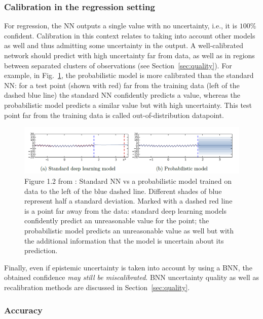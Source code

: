 \subsubsection{Calibration in the regression setting}\label{sec:calib}
For regression, the NN outputs a single value with no uncertainty, i.e., it is $100 \%$ confident. 
Calibration in this context relates to taking into account other models as well and thus admitting some uncertainty in the output.
A well-calibrated network should predict with high uncertainty far from data, as well as in regions between separated clusters of observations (see Section~\ref{sec:quality}).
For example, in Fig.~\ref{fig:pointvsbnn}, the probabilistic model is more calibrated than the standard NN: for a test point (shown with red) far from the training data (left of the dashed blue line) the standard NN confidently predicts a value, whereas the probabilistic model predicts a similar value but with high uncertainty.
This test point far from the training data is called out-of-distribution datapoint.
\begin{figure}
	\centering
	\includegraphics[width=0.9\linewidth]{./Figures/pointvsbnn.png}
	\caption{Figure 1.2 from \textcite{gal2016uncertainty}: Standard NN vs a probabilistic model trained on data to the left of the blue dashed line.
		Different shades of blue represent half a standard deviation. Marked with a dashed red line is a point far away from the data: standard deep learning models confidently predict an unreasonable value for the point; the probabilistic model predicts an unreasonable value as well but with the additional information that the model is uncertain about its prediction.}
	\label{fig:pointvsbnn}
\end{figure} 

Finally, even if epistemic uncertainty is taken into account by using a BNN, the obtained confidence \textit{may still be miscalibrated}. 
BNN uncertainty quality as well as recalibration methods are discussed in Section~\ref{sec:quality}.

\subsubsection{Accuracy}

